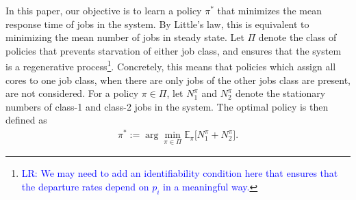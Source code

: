 \documentclass[11pt]{article}
\theoremstyle{remark}
\theoremstyle{definition}
\numberwithin{equation}{section}
\begin{document}
In this paper, our objective is to learn a policy $\pi^*$ that minimizes the mean response time  of jobs in the system.
By Little’s law, this is equivalent to minimizing the mean number of jobs in steady state.
Let $\Pi$ denote the class of policies that  prevents starvation of either job class, and ensures that the system is a regenerative process\footnote{\textcolor{blue}{LR: We may need to add an identifiability condition here that ensures that the departure rates depend on $p_i$ in a meaningful way.}}. {Concretely, this means that policies which assign all cores to one job class, when there are only jobs of the other jobs class are present, are not considered}.
For a policy $\pi \in \Pi$, let $N^{\pi}_1$ and $N^{\pi}_2$ denote the stationary numbers of class-1 and class-2 jobs in the system. The optimal policy is then defined as
\begin{align*}
\pi^* := \arg\min_{\pi \in \Pi} \mathbb{E}_{\pi}\big[N^{\pi}_1 + N^{\pi}_2\big].
\end{align*}
\end{document}
